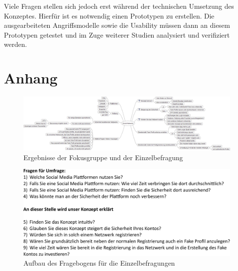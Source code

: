 \documentclass{sigchi}
\begin{document}
Viele Fragen stellen sich jedoch erst während der technischen Umsetzung des Konzeptes. Hierfür ist es notwendig einen Prototypen zu erstellen. Die ausgearbeiteten Angriffsmodelle sowie die Usability müssen dann an diesem Prototypen getestet und im Zuge weiterer Studien analysiert und verifiziert werden.



\balance{}





\clearpage
\onecolumn
\section{Anhang}
\begin{figure}[h]
	\centering
	\includegraphics[width=\columnwidth]{figures/Social-Networks.png}
	\caption{Ergebnisse der Fokusgruppe und der Einzelbefragung}
	\label{fig:MindMapAnhang}
\end{figure}
\newpage
\begin{figure}[h]
	\centering
	\includegraphics[width=0.8\columnwidth]{figures/Fragebogen.pdf}
	\caption{Aufbau des Fragebogens für die Einzelbefragungen}
	\label{fig:Fragebogen}
\end{figure}
\end{document}
